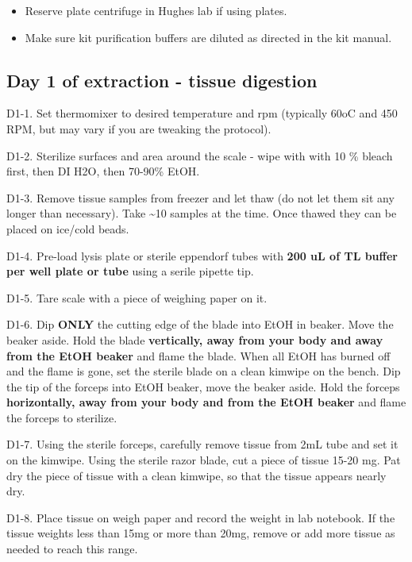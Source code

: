 \documentclass[
  letterpaper,
  DIV=11,
  numbers=noendperiod]{scrreprt}
\begin{document}
\begin{itemize}
\item
  Reserve plate centrifuge in Hughes lab if using plates.
\item
  Make sure kit purification buffers are diluted as directed in the kit
  manual.
\end{itemize}

\hypertarget{day-1-of-extraction---tissue-digestion}{%
\subsection*{\texorpdfstring{\textbf{Day 1 of extraction - tissue
digestion}}{Day 1 of extraction - tissue digestion}}\label{day-1-of-extraction---tissue-digestion}}

D1-1. Set thermomixer to desired temperature and rpm (typically 60oC and
450 RPM, but may vary if you are tweaking the protocol).

D1-2. Sterilize surfaces and area around the scale - wipe with with 10
\% bleach first, then DI H2O, then 70-90\% EtOH.

D1-3. Remove tissue samples from freezer and let thaw (do not let them
sit any longer than necessary). Take \textasciitilde10 samples at the
time. Once thawed they can be placed on ice/cold beads.

D1-4. Pre-load lysis plate or sterile eppendorf tubes with \textbf{200
uL of TL buffer per well plate or tube} using a serile pipette tip.

D1-5. Tare scale with a piece of weighing paper on it.

D1-6. Dip \textbf{ONLY} the cutting edge of the blade into EtOH in
beaker. Move the beaker aside. Hold the blade \textbf{vertically, away
from your body and away from the EtOH beaker} and flame the blade. When
all EtOH has burned off and the flame is gone, set the sterile blade on
a clean kimwipe on the bench. Dip the tip of the forceps into EtOH
beaker, move the beaker aside. Hold the forceps \textbf{horizontally,
away from your body and from the EtOH beaker} and flame the forceps to
sterilize.

D1-7. Using the sterile forceps, carefully remove tissue from 2mL tube
and set it on the kimwipe. Using the sterile razor blade, cut a piece of
tissue 15-20 mg. Pat dry the piece of tissue with a clean kimwipe, so
that the tissue appears nearly dry.

D1-8. Place tissue on weigh paper and record the weight in lab notebook.
If the tissue weights less than 15mg or more than 20mg, remove or add
more tissue as needed to reach this range.
\end{document}
